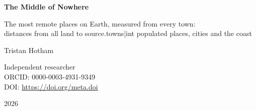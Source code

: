 \documentclass[11pt,a4paper]{article}
\begin{document}
\begin{center}
{\Large\bfseries The Middle of Nowhere\par}
\vspace{0.4em}
{\large The most remote places on Earth, measured from every town:\\distances from all land to {{source.towns|int}} populated places, cities and the coast\par}
\vspace{1.2em}
{\large Tristan Hotham\par}
\vspace{0.3em}
{\small Independent researcher\\
ORCID: 0000-0003-4931-9349\\
DOI: \href{https://doi.org/{{meta.doi}}}{https://doi.org/{{meta.doi}}}\par}
\vspace{0.8em}
2026
\end{center}
\end{document}
